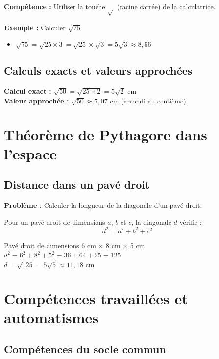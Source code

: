 \textbf{Compétence :} Utiliser la touche $\sqrt{}$ (racine carrée) de la calculatrice.

\textbf{Exemple :} Calculer $\sqrt{75}$
\begin{itemize}
    \item $\sqrt{75} = \sqrt{25 \times 3} = \sqrt{25} \times \sqrt{3} = 5\sqrt{3} \approx 8,66$
\end{itemize}

\subsection{Calculs exacts et valeurs approchées}

\textbf{Calcul exact :} $\sqrt{50} = \sqrt{25 \times 2} = 5\sqrt{2}$ cm\\
\textbf{Valeur approchée :} $\sqrt{50} \approx 7,07$ cm (arrondi au centième)

\section{Théorème de Pythagore dans l'espace}

\subsection{Distance dans un pavé droit}

\textbf{Problème :} Calculer la longueur de la diagonale d'un pavé droit.

Pour un pavé droit de dimensions $a$, $b$ et $c$, la diagonale $d$ vérifie :
\[d^2 = a^2 + b^2 + c^2\]

\begin{examplebox}
Pavé droit de dimensions 6 cm × 8 cm × 5 cm\\
$d^2 = 6^2 + 8^2 + 5^2 = 36 + 64 + 25 = 125$\\
$d = \sqrt{125} = 5\sqrt{5} \approx 11,18$ cm
\end{examplebox}

\section{Compétences travaillées et automatismes}

\subsection{Compétences du socle commun}

